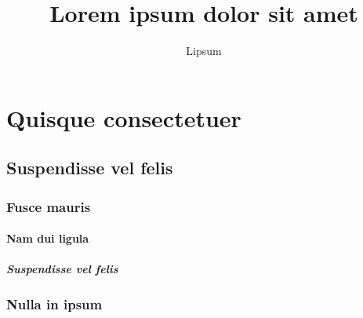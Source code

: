 \documentclass{scrreprt}
\author{Lipsum}
\title{Lorem ipsum dolor sit amet}
\begin{document}

\maketitle

\begin{abstract}
	\lipsum[23]
\end{abstract}

\tableofcontents

\part{Quisque consectetuer}

\chapter{Suspendisse vel felis}
\lipsum[42]
\section{Fusce mauris}
\lipsum[6]
\lipsum[7]

\subsection{Nam dui ligula}
\lipsum[56]
\lipsum[57]
\lipsum[58]

\subsubsection{Suspendisse vel felis}
\lipsum[12]
\lipsum[13]

\section{Nulla in ipsum}
\lipsum[14]
\lipsum[15]
\end{document}
